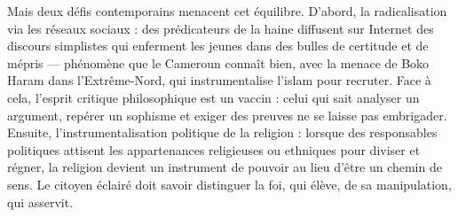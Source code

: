 \documentclass[11pt]{article}
\newcommand{\cle}[1]{{\popxbold\color{popdark}#1}}
\begin{document}
Mais deux défis contemporains menacent cet équilibre. D'abord, la \cle{radicalisation via les réseaux sociaux} : des prédicateurs de la haine diffusent sur Internet des discours simplistes qui enferment les jeunes dans des bulles de certitude et de mépris — phénomène que le Cameroun connaît bien, avec la menace de Boko Haram dans l'Extrême-Nord, qui instrumentalise l'islam pour recruter. Face à cela, l'esprit critique philosophique est un vaccin : celui qui sait analyser un argument, repérer un sophisme et exiger des preuves ne se laisse pas embrigader. Ensuite, l'\cle{instrumentalisation politique de la religion} : lorsque des responsables politiques attisent les appartenances religieuses ou ethniques pour diviser et régner, la religion devient un instrument de pouvoir au lieu d'être un chemin de sens. Le citoyen éclairé doit savoir distinguer la foi, qui élève, de sa manipulation, qui asservit.
\end{document}
